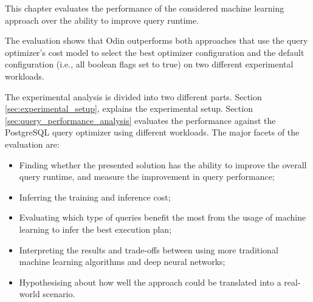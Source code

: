 This chapter evaluates the performance of the considered machine learning approach over the ability to improve query runtime.

The evaluation shows that Odin outperforms both approaches that use the query optimizer's cost model to select the best optimizer configuration and the default configuration (i.e., all boolean flags set to true) on two different experimental workloads. 

The experimental analysis is divided into two different parts. Section \ref{sec:experimental_setup}, explains the experimental setup. Section \ref{sec:query_performance_analysis} evaluates the performance against the PostgreSQL query optimizer using different workloads. The major facets of the evaluation are:

\begin{itemize}
    \item Finding whether the presented solution has the ability to improve the overall query runtime, and measure the improvement in query performance;
    \item Inferring the training and inference cost;
    \item Evaluating which type of queries benefit the most from the usage of machine learning to infer the best execution plan;
    \item Interpreting the results and trade-offs between using more traditional machine learning algorithms and deep neural networks;
    \item Hypothesising about how well the approach could be translated into a real-world scenario.
\end{itemize}